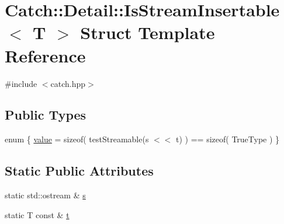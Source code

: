 \hypertarget{structCatch_1_1Detail_1_1IsStreamInsertable}{\section{Catch\-:\-:Detail\-:\-:Is\-Stream\-Insertable$<$ T $>$ Struct Template Reference}
\label{structCatch_1_1Detail_1_1IsStreamInsertable}
}


{\ttfamily \#include $<$catch.\-hpp$>$}

\subsection*{Public Types}
\begin{DoxyCompactItemize}
\item 
enum \{ \hyperlink{structCatch_1_1Detail_1_1IsStreamInsertable_a2e4508694da3bf368ff67733a7970edda765a324929702bfce2969fc19fc4f926}{value} = sizeof( test\-Streamable(s $<$$<$ t) ) == sizeof( True\-Type )
 \}
\end{DoxyCompactItemize}
\subsection*{Static Public Attributes}
\begin{DoxyCompactItemize}
\item 
static std\-::ostream \& \hyperlink{structCatch_1_1Detail_1_1IsStreamInsertable_abe3d3c8e5d85665747faafffc9a96b00}{s}
\item 
static T const \& \hyperlink{structCatch_1_1Detail_1_1IsStreamInsertable_a7d2a3da978b6736667a7b2f6d51f507f}{t}
\end{DoxyCompactItemize}



